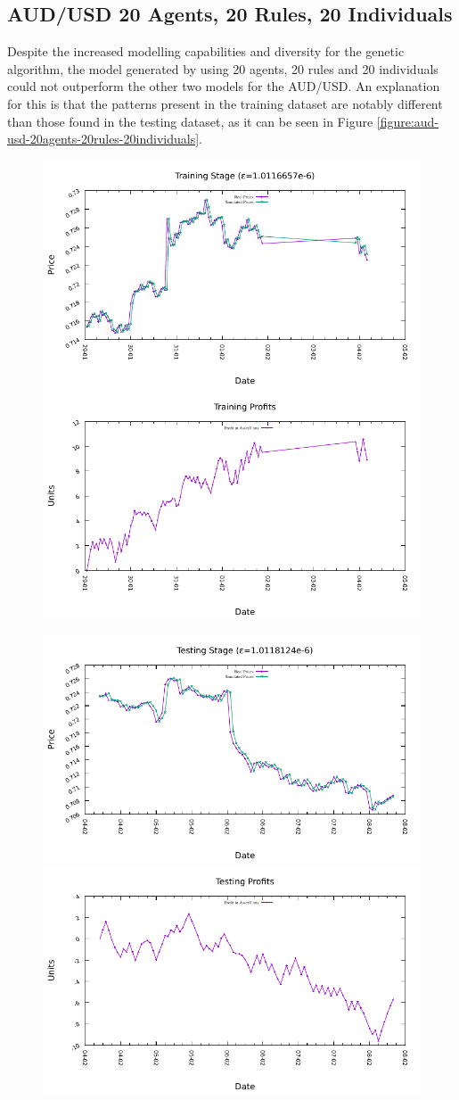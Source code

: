 \newpage

\subsection{AUD/USD 20 Agents, 20 Rules, 20 Individuals}
\label{results:forecast-aud-usd-20agents-20rules-20individuals}

Despite the increased modelling capabilities and diversity for the genetic algorithm, the model generated by using 20 agents, 20 rules and 20 individuals could not outperform the other two models for the AUD/USD. An explanation for this is that the patterns present in the training dataset are notably different than those found in the testing dataset, as it can be seen in Figure \ref{figure:aud-usd-20agents-20rules-20individuals}.

\begin{figure}[htp]
  \centering

  \includegraphics[width=.45\textwidth]{img/plots/aud_usd_h1-20agents-20rules-20ind-100gen_training_fit.pdf}\quad
  \includegraphics[width=.45\textwidth]{img/plots/aud_usd_h1-20agents-20rules-20ind-100gen_training_profits.pdf}

  \medskip

  \includegraphics[width=.45\textwidth]{img/plots/aud_usd_h1-20agents-20rules-20ind-100gen_testing_fit.pdf}\quad
  \includegraphics[width=.45\textwidth]{img/plots/aud_usd_h1-20agents-20rules-20ind-100gen_testing_profits.pdf}


\end{figure}
